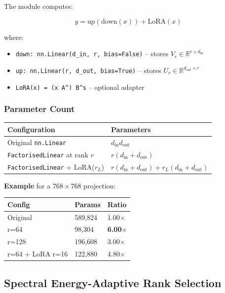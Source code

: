 The module computes:

\[
y = \text{up}(\text{down}(x)) + \text{LoRA}(x)
\tag{4.2}
\]

where:

\begin{itemize}
\item \texttt{down: nn.Linear(d\_in, r, bias=False)} -- stores $V_r \in \mathbb{R}^{r \times d_\text{in}}$
\item \texttt{up: nn.Linear(r, d\_out, bias=True)} -- stores $U_r \in \mathbb{R}^{d_\text{out} \times r}$
\item \texttt{LoRA(x) = (x A^\top) B^\top \cdot s} -- optional adapter

\end{itemize}
\subsubsection{Parameter Count}

\begin{table}[H]
\centering
\small
\begin{tabular}{ll}
\toprule
\textbf{Configuration} & \textbf{Parameters} \\
\midrule
Original \texttt{nn.Linear} & $d_\text{in} d_\text{out}$ \\
\texttt{FactorisedLinear} at rank $r$ & $r(d_\text{in} + d_\text{out})$ \\
\texttt{FactorisedLinear} + LoRA($r_L$) & $r(d_\text{in} + d_\text{out}) + r_L(d_\text{in} + d_\text{out})$ \\
\bottomrule
\end{tabular}
\end{table}

\textbf{Example} for a $768 \times 768$ projection:

\begin{table}[H]
\centering
\small
\begin{tabular}{lll}
\toprule
\textbf{Config} & \textbf{Params} & \textbf{Ratio} \\
\midrule
Original & 589,824 & 1.00$\times$ \\
r=64 & 98,304 & \textbf{6.00$\times$} \\
r=128 & 196,608 & 3.00$\times$ \\
r=64 + LoRA r=16 & 122,880 & 4.80$\times$ \\
\bottomrule
\end{tabular}
\end{table}

\subsection{Spectral Energy-Adaptive Rank Selection}

